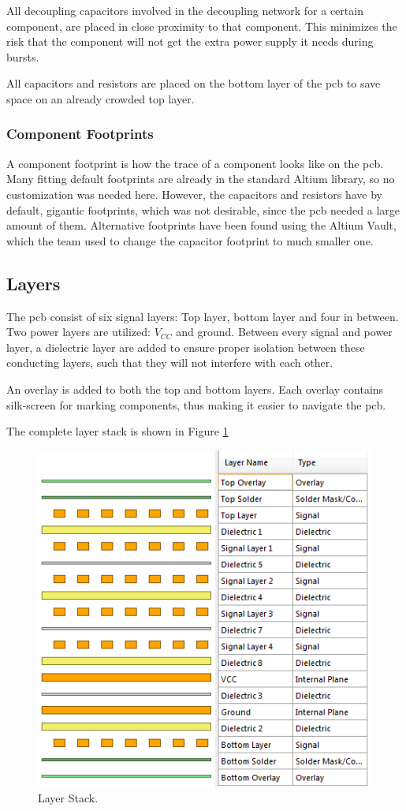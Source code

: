 All decoupling capacitors involved in the decoupling network for a certain component, are placed in close proximity to that component.
This minimizes the risk that the component will not get the extra power supply it needs during bursts.

All capacitors and resistors are placed on the bottom layer of the \gls{pcb} to save space on an already crowded top layer.

\subsubsection{Component Footprints}
A component footprint is how the trace of a component looks like on the \gls{pcb}.
Many fitting default footprints are already in the standard Altium library, so no customization was needed here.
However, the capacitors and resistors have by default, gigantic footprints, which was not desirable, since the \gls{pcb} needed a large amount of them.
Alternative footprints have been found using the Altium Vault, which the team used to change the capacitor footprint to much smaller one.

\subsection{Layers}
The \gls{pcb} consist of six signal layers: Top layer, bottom layer and four in between.
Two power layers are utilized: \(V_{CC}\) and ground.
Between every signal and power layer, a dielectric layer are added to ensure proper isolation between these conducting layers, such that they will not interfere with each other.

An overlay is added to both the top and bottom layers.
Each overlay contains silk-screen for marking components, thus making it easier to navigate the \gls{pcb}.

The complete layer stack is shown in Figure \ref{fig:Layers}

\begin{figure}[h!]
\centering
\includegraphics[scale = 0.8]{images/Layers.png}
\caption{Layer Stack.}
\label{fig:Layers}
\end{figure}

